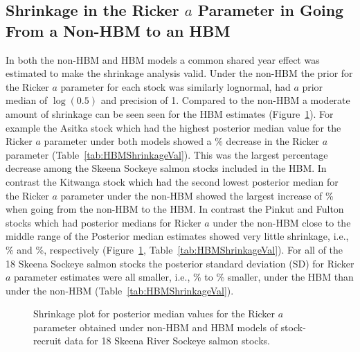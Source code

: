\documentclass[french,11pt]{book}
\begin{document}
\endgroup{} \endgroup{}

\label{results-1}

\subsection{\texorpdfstring{Shrinkage in the Ricker \(a\) Parameter in Going From a Non-HBM to an HBM}{Shrinkage in the Ricker a Parameter in Going From a Non-HBM to an HBM}}\label{HBMShrinkage}

In both the non-HBM and HBM models a common shared year effect was estimated to make the shrinkage analysis valid. Under the non-HBM the prior for the Ricker \(a\) parameter for each stock was similarly lognormal, had \(a\) prior median of \(\log(0.5)\) and precision of 1. Compared to the non-HBM a moderate amount of shrinkage can be seen seen for the HBM estimates (Figure~\ref{fig:HBMShrinkage}). For example the Asitka stock which had the highest posterior median value for the Ricker \(a\) parameter under both models showed a \% decrease in the Ricker \(a\) parameter (Table~\ref{tab:HBMShrinkageVal}). This was the largest percentage decrease among the Skeena Sockeye salmon stocks included in the HBM. In contrast the Kitwanga stock which had the second lowest posterior median for the Ricker \(a\) parameter under the non-HBM showed the largest increase of \% when going from the non-HBM to the HBM. In contrast the Pinkut and Fulton stocks which had posterior medians for Ricker \(a\) under the non-HBM close to the middle range of the Posterior median estimates showed very little shrinkage, i.e., \% and \%, respectively (Figure~\ref{fig:HBMShrinkage}, Table~\ref{tab:HBMShrinkageVal}). For all of the 18 Skeena Sockeye salmon stocks the posterior standard deviation (SD) for Ricker \(a\) parameter estimates were all smaller, i.e., \% to \% smaller, under the HBM than under the non-HBM (Table~\ref{tab:HBMShrinkageVal}).
\begin{figure}[htb]

{\centering {} 

}

\caption{Shrinkage plot for posterior median values for the Ricker $a$ parameter obtained under non-HBM and HBM models of stock-recruit data for 18 Skeena River Sockeye salmon stocks.}\label{fig:HBMShrinkage}
\end{figure}
\begingroup\fontsize{10}{12}\selectfont \begingroup\fontsize{10}{12}\selectfont  
\end{document}
